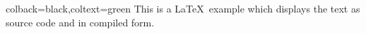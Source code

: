 \documentclass{article}
\begin{document}
\begin{tcblisting}{colback=black,coltext=green}
This is a \LaTeX\ example which displays the text as source code
and in compiled form.
\end{tcblisting}
\end{document}
